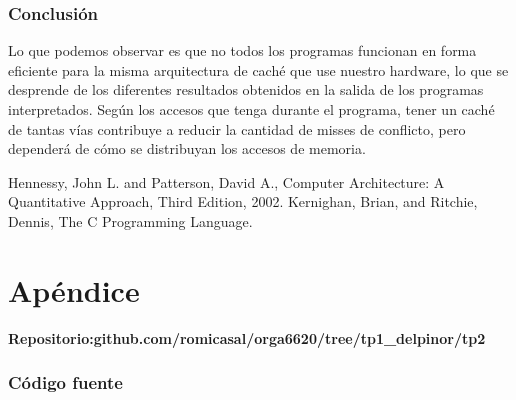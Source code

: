 \documentclass[a4paper, 10pt, twoside, notitlepage]{article}
\begin{document}
\section{Conclusión}
Lo que podemos observar es que no todos los programas funcionan en forma eficiente para la misma arquitectura de caché que use nuestro hardware, lo que se desprende de los diferentes resultados obtenidos en la salida de los programas interpretados.
Según los accesos que tenga durante el programa, tener un caché de tantas vías contribuye a reducir la cantidad de misses de conflicto, pero dependerá de cómo se distribuyan los accesos de memoria. \\

\vspace{.5cm}
\begin{thebibliography}{5}
 \bibitem{} Hennessy, John L. and Patterson, David A., Computer Architecture: A Quantitative Approach, Third Edition, 2002.
 \bibitem{} Kernighan, Brian, and Ritchie, Dennis, The C Programming Language.
\end{thebibliography}

\clearpage

\part{Apéndice}
\appendix

\normalsize
\textbf{Repositorio:github.com/romicasal/orga6620/tree/tp1\_delpinor/tp2}

\section{Código fuente}\label{sec:codigofuente}
\end{document}
